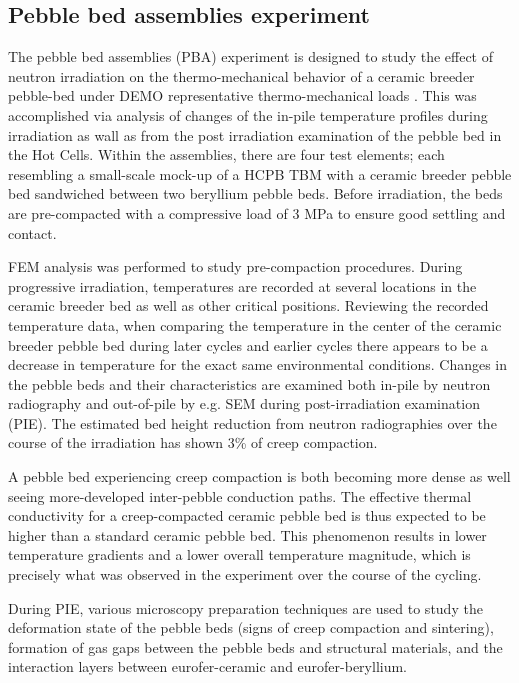 \subsection{Pebble bed assemblies experiment}
The pebble bed assemblies (PBA) experiment is designed to study the effect of neutron irradiation on the thermo-mechanical behavior of a ceramic breeder pebble-bed under DEMO representative thermo-mechanical loads \cite{Magielsen2007}. This was accomplished via analysis of changes of the in-pile temperature profiles during irradiation as wall as from the post irradiation examination of the pebble bed in the Hot Cells. Within the assemblies, there are four test elements; each resembling a small-scale mock-up of a HCPB TBM with a ceramic breeder pebble bed sandwiched between two beryllium pebble beds. Before irradiation, the beds are pre-compacted with a compressive load of 3 MPa to ensure good settling and contact.  

FEM analysis was performed to study pre-compaction procedures.  During progressive irradiation, temperatures are recorded at several locations in the ceramic breeder bed as well as other critical positions. Reviewing the recorded temperature data, when comparing the temperature in the center of the ceramic breeder pebble bed during later cycles and earlier cycles there appears to be a decrease in temperature for the exact same environmental conditions. Changes in the pebble beds and their characteristics are examined both in-pile by neutron radiography and out-of-pile by e.g. SEM during post-irradiation examination (PIE). The estimated bed height reduction from neutron radiographies over the course of the irradiation has shown 3\% of creep compaction. 

A pebble bed experiencing creep compaction is both becoming more dense as well seeing more-developed inter-pebble conduction paths. The effective thermal conductivity for a creep-compacted ceramic pebble bed is thus expected to be higher than a standard ceramic pebble bed. This phenomenon results in lower temperature gradients and a lower overall temperature magnitude, which is precisely what was observed in the experiment over the course of the cycling. 

During PIE, various microscopy preparation techniques are used to study the deformation state of the pebble beds (signs of creep compaction and sintering), formation of gas gaps between the pebble beds and structural materials, and the interaction layers between eurofer-ceramic and eurofer-beryllium. 

